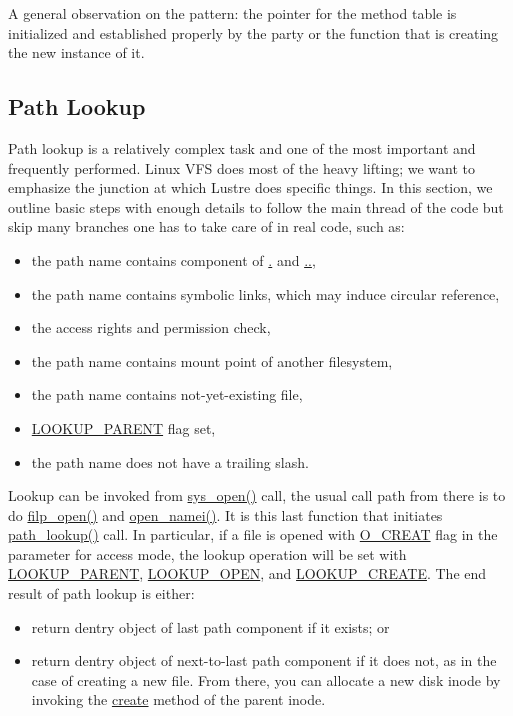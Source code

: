 A general observation on the pattern: the pointer for the method table is
initialized and established properly by the party or the function that
is creating the new instance of it.

\subsection{Path Lookup}

Path lookup is a relatively complex task and one of the most important and
frequently performed. Linux VFS does most of the heavy lifting; we want to
emphasize the junction at which Lustre does specific things.  In this
section, we outline basic steps with enough details to follow the main
thread of the code but skip many branches one has to take care of in real
code, such as:

\begin{itemize}
\item the path name contains component of \url{.} and \url{..},
\item the path name contains symbolic links, which may induce circular
reference,
\item the access rights and permission check,
\item the path name contains mount point of another filesystem,
\item the path name contains not-yet-existing file,
\item \url{LOOKUP_PARENT} flag set,
\item the path name does not have a trailing slash.
\end{itemize}

Lookup can be invoked from \url{sys_open()} call, the usual call path from
there is to do \url{filp_open()} and \url{open_namei()}. It is this last
function that initiates \url{path_lookup()} call. In particular, if a file is
opened with \url{O_CREAT} flag in the parameter for access mode, the lookup
operation will be set with \url{LOOKUP_PARENT}, \url{LOOKUP_OPEN}, and
\url{LOOKUP_CREATE}. The end result of path lookup is either: \begin{itemize}
\item return dentry object of last path component if it exists; or \item
return dentry object of next-to-last path component if it does not, as in the
case of creating a new file. From there, you can allocate a new disk inode by
invoking the \url{create} method of the parent inode.  \end{itemize}

